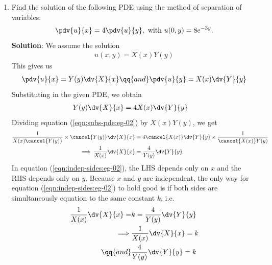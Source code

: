 \begin{enumerate}
            \item Find the solution of the following PDE using the method of separation of variables:
            \begin{align*}
                \pdv{u}{x}=4\pdv{u}{y},\text{ with }u(0,y)=8e^{-3y}.
            \end{align*}
            \textbf{Solution}: \setcounter{equation}{0}
            We assume the solution
            \begin{align}
                u(x,y)=X(x)Y(y) \label{eqn:assumed-soln:eg-02}
            \end{align}
            This gives us
            \begin{align*}
                \pdv{u}{x}=Y(y)\dv{X}{x}\qq{and}\pdv{u}{y}=X(x)\dv{Y}{y}
            \end{align*}
            Substituting in the given PDE, we obtain
            \begin{align}
                Y(y)\dv{X}{x}&=4X(x)\dv{Y}{y} \label{eqn:subs-pde:eg-02}
            \end{align}
            Dividing equation (\ref{eqn:subs-pde:eg-02}) by $X(x)Y(y)$, we get
            \begin{align}
                \dfrac{1}{X(x)\cancel{Y(y)}}\times \cancel{Y(y)}\dv{X}{x}&=4\cancel{X(x)}\dv{Y}{y}\times \dfrac{1}{\cancel{X(x)}Y(y)} \nonumber\\
                \implies\dfrac{1}{X(x)}\dv{X}{x}&=\dfrac{4}{Y(y)}\dv{Y}{y} \label{eqn:indep-sides:eg-02}
            \end{align}
            In equation (\ref{eqn:indep-sides:eg-02}), the LHS depends only on $x$ and the RHS depends only on $y$. Because $x$ and $y$ are independent, the only way for equation (\ref{eqn:indep-sides:eg-02}) to hold good is if both sides are simultaneously equation to the same constant $k$, i.e.
            \begin{align}
                \dfrac{1}{X(x)}\dv{X}{x}=&k=\dfrac{4}{Y(y)}\dv{Y}{y} \nonumber\\
                \implies &\dfrac{1}{X(x)}\dv{X}{x}=k \label{eqn:ode-X:eg-02}\\
                \qq{and} &\dfrac{4}{Y(y)}\dv{Y}{y}=k \label{eqn:ode-Y:eg-02}
            \end{align}


\end{enumerate}
